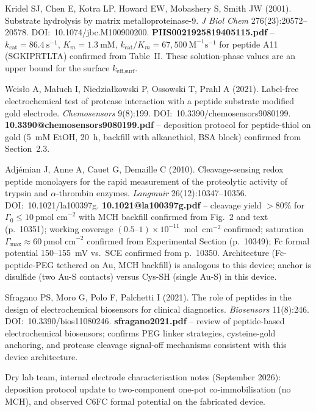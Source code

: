 \documentclass[10pt,a4paper]{article}
\numberwithin{equation}{section}
\newcommand{\Mms}{\text{M}^{-1}\text{s}^{-1}}
\begin{document}
\begin{enumerate}[label={[\arabic*]},noitemsep,leftmargin=*]
\item Kridel SJ, Chen E, Kotra LP, Howard EW, Mobashery S, Smith JW (2001). Substrate
  hydrolysis by matrix metalloproteinase-9.
  \textit{J Biol Chem} 276(23):20572--20578. DOI:~10.1074/jbc.M100900200.
  \textbf{PIIS0021925819405115.pdf} -- $k_{\text{cat}} = 86.4\ \text{s}^{-1}$,
  $K_m = 1.3\ \text{mM}$, $k_{\text{cat}}/K_m = 67{,}500\ \Mms$ for peptide A11
  (SGKIPRTLTA) confirmed from Table~II. These solution-phase values are an upper bound
  for the surface $k_{\text{eff,surf}}$.

\item Wcis\l{}o A, Ma{\l}uch I, Niedzia{\l}kowski P, Ossowski T, Prahl A (2021).
  Label-free electrochemical test of protease interaction with a peptide substrate
  modified gold electrode.
  \textit{Chemosensors} 9(8):199. DOI:~10.3390/chemosensors9080199.
  \textbf{10.3390@chemosensors9080199.pdf} -- deposition protocol for peptide-thiol
  on gold (5~mM EtOH, 20~h, backfill with alkanethiol, BSA block) confirmed from
  Section~2.3.

\item Adj\'{e}mian J, Anne A, Cauet G, Demaille C (2010). Cleavage-sensing redox peptide
  monolayers for the rapid measurement of the proteolytic activity of trypsin and
  $\alpha$-thrombin enzymes.
  \textit{Langmuir} 26(12):10347--10356. DOI:~10.1021/la100397g.
  \textbf{10.1021@la100397g.pdf} -- cleavage yield $>$80\% for $\Gamma_0 \leq
  10\ \text{pmol~cm}^{-2}$ with MCH backfill confirmed from Fig.~2 and text (p.~10351);
  working coverage $(0.5\text{--}1) \times 10^{-11}$~mol~cm$^{-2}$ confirmed; saturation
  $\Gamma_{\max} \approx 60\ \text{pmol~cm}^{-2}$ confirmed from Experimental Section
  (p.~10349); Fc formal potential 150--155~mV vs.\ SCE confirmed from p.~10350.
  Architecture (Fc-peptide-PEG tethered on Au, MCH backfill) is analogous to this device;
  anchor is disulfide (two Au-S contacts) versus Cys-SH (single Au-S) in this device.

\item Sfragano PS, Moro G, Polo F, Palchetti I (2021). The role of peptides in the
  design of electrochemical biosensors for clinical diagnostics.
  \textit{Biosensors} 11(8):246. DOI:~10.3390/bios11080246.
  \textbf{sfragano2021.pdf} -- review of peptide-based electrochemical biosensors;
  confirms PEG linker strategies, cysteine-gold anchoring, and protease cleavage
  signal-off mechanisms consistent with this device architecture.

\item Dry lab team, internal electrode characterisation notes (September
  2026): deposition protocol update to two-component one-pot
  co-immobilisation (no MCH), and observed C6FC formal potential on the
  fabricated device.

\end{enumerate}
\end{document}
